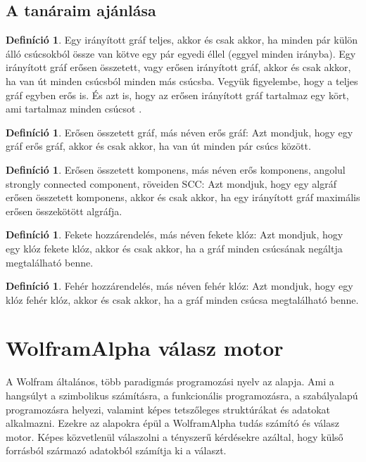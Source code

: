 \documentclass[
]{thesis-ekf}
\theoremstyle{definition}
\newtheorem{definicio}[tetel]{Definíció}
\theoremstyle{remark}
\begin{document}
	\subsection{A tanáraim ajánlása}\label{szakirodalom}
	\begin{definicio}
		Egy irányított gráf teljes, akkor és csak akkor, ha minden pár külön álló csúcsokból össze van kötve egy pár egyedi éllel (eggyel minden irányba). Egy irányított gráf erősen összetett, vagy erősen irányított gráf, akkor és csak akkor, ha van út minden csúcsból minden más csúcsba. Vegyük figyelembe, hogy a teljes gráf egyben erős is. És azt is, hogy az erősen irányított gráf tartalmaz egy kört, ami tartalmaz minden csúcsot \cite{synasc2020}.
	\end{definicio}

	\begin{definicio}
		Erősen összetett gráf, más néven erős gráf: Azt mondjuk, hogy egy gráf erős gráf, akkor és csak akkor, ha van út minden pár csúcs között.
	\end{definicio}
	
	\begin{definicio}
		Erősen összetett komponens, más néven erős komponens, angolul strongly connected component, röveiden SCC: Azt mondjuk, hogy egy algráf erősen összetett komponens, akkor és csak akkor, ha egy irányított gráf maximális erősen összekötött algráfja. 
	\end{definicio}
	
	\begin{definicio}
		Fekete hozzárendelés, más néven fekete klóz: Azt mondjuk, hogy egy klóz fekete klóz, akkor és csak akkor, ha a gráf minden csúcsának negáltja megtalálható benne.
	\end{definicio}
	
	\begin{definicio}
		Fehér hozzárendelés, más néven fehér klóz: Azt mondjuk, hogy egy klóz fehér klóz, akkor és csak akkor, ha a gráf minden csúcsa megtalálható benne.
	\end{definicio}
	
	\section{WolframAlpha válasz motor}\label{wolframalpha}
	A Wolfram általános, több paradigmás programozási nyelv az alapja. Ami a hangsúlyt a szimbolikus számításra, a funkcionális programozásra, a szabályalapú programozásra helyezi, valamint képes tetszőleges struktúrákat és adatokat alkalmazni. Ezekre az alapokra épül a WolframAlpha tudás számító és válasz motor. Képes közvetlenül válaszolni a tényszerű kérdésekre azáltal, hogy külső forrásból származó adatokból számítja ki a választ.
	
\end{document}

